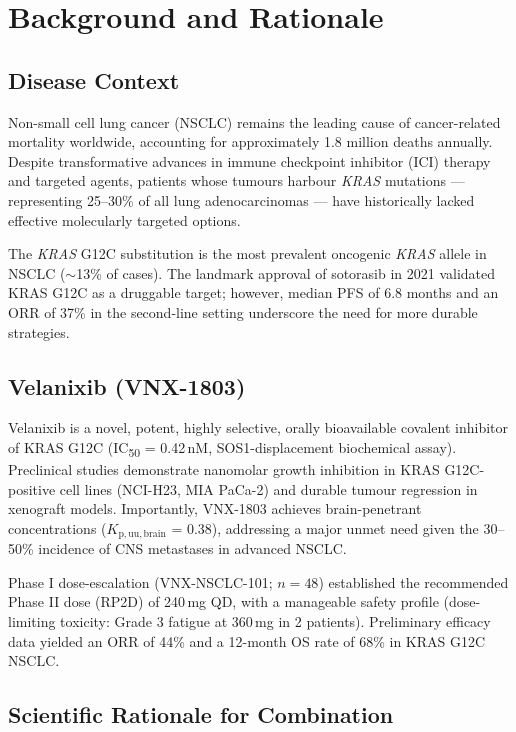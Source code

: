 \section{Background and Rationale}
\label{sec:background}

\subsection{Disease Context}

Non-small cell lung cancer (NSCLC) remains the leading cause of cancer-related mortality worldwide, accounting for approximately 1.8 million deaths annually. Despite transformative advances in immune checkpoint inhibitor (ICI) therapy and targeted agents, patients whose tumours harbour \textit{KRAS} mutations --- representing 25--30\% of all lung adenocarcinomas --- have historically lacked effective molecularly targeted options.

The \textit{KRAS} G12C substitution is the most prevalent oncogenic \textit{KRAS} allele in NSCLC ($\sim$13\% of cases). The landmark approval of sotorasib in 2021 validated KRAS G12C as a druggable target; however, median PFS of 6.8 months and an ORR of 37\% in the second-line setting underscore the need for more durable strategies.

\subsection{Velanixib (VNX-1803)}

Velanixib is a novel, potent, highly selective, orally bioavailable covalent inhibitor of KRAS G12C (IC\textsubscript{50} = 0.42\,nM, SOS1-displacement biochemical assay). Preclinical studies demonstrate nanomolar growth inhibition in KRAS G12C-positive cell lines (NCI-H23, MIA PaCa-2) and durable tumour regression in xenograft models. Importantly, VNX-1803 achieves brain-penetrant concentrations ($K_{\mathrm{p,uu,brain}}$ = 0.38), addressing a major unmet need given the 30--50\% incidence of CNS metastases in advanced NSCLC.

Phase I dose-escalation (VNX-NSCLC-101; $n=48$) established the recommended Phase II dose (RP2D) of 240\,mg QD, with a manageable safety profile (dose-limiting toxicity: Grade 3 fatigue at 360\,mg in 2 patients). Preliminary efficacy data yielded an ORR of 44\% and a 12-month OS rate of 68\% in KRAS G12C NSCLC.

\subsection{Scientific Rationale for Combination}

